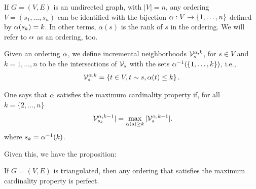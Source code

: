\begin{definition}
\label{def:order}
If $G = (V, E)$ is an undirected graph, with $|V| = n$, any ordering $V = (s_1,
\ldots, s_n)$ can be identified with the bijection $\alpha: V\to \{1,
\ldots, n\}$ defined by $\alpha(s_k) = k$. In other terms, $\alpha(s)$ is the rank of $s$ in the ordering. 
We will refer to $\alpha$ as an
ordering, too.

Given an ordering $\alpha$, we define incremental neighborhoods
${\mathcal V}^{\alpha, k}_s$, for $s\in V$ and $k=1, \ldots, n$ to be the
intersections of ${\mathcal V}_s$ with the sets $\alpha^{-1}(\{1, \ldots, k\})$,
i.e., 
\[
{\mathcal V}^{\alpha,k}_s = \left\{ t\in V, t\sim s, \alpha(t) \leq k \right\}.
\]

One says that $\alpha$ satisfies the maximum cardinality property if, for
all $k=\{2, \ldots, n\}$ 
\begin{equation}
\label{eq:max.card}
|{\mathcal V}^{\alpha,k-1}_{s_k}| = \max_{\alpha(s) \geq k} |{\mathcal V}^{\alpha,k-1}_{s}|.
\end{equation}
where $s_k = \alpha^{-1}(k)$.
\end{definition}

Given this, we have the proposition:
\begin{proposition}
\label{prop:max.card}
If $G = (V, E)$ is triangulated, then any ordering that satisfies the
maximum cardinality property is perfect.
\end{proposition}

